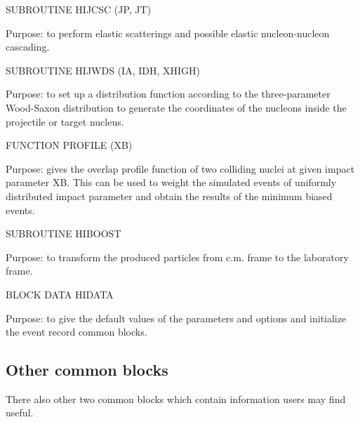 \begin{description}
\itemsep=-4.0pt
\item{}SUBROUTINE HIJCSC (JP, JT)
\item{}Purpose: to perform elastic scatterings and possible elastic
        nucleon-nucleon cascading.
\end{description}

\begin{description}
\itemsep=-4.0pt
\item{}SUBROUTINE HIJWDS (IA, IDH, XHIGH)
\item{}Purpose: to set up a distribution function according to the
        three-parameter Wood-Saxon distribution to generate the
        coordinates of the nucleons inside the projectile or
        target nucleus.
\end{description}

\begin{description}
\itemsep=-4.0pt
\item{}FUNCTION  PROFILE (XB)
\item{}Purpose: gives the overlap profile function of two colliding
        nuclei at given impact parameter XB. This can be used to
        weight the simulated events of uniformly distributed impact
        parameter and obtain the results of the minimum biased events.
\end{description}

\begin{description}
\itemsep=-4.0pt
\item{}SUBROUTINE HIBOOST
\item{}Purpose: to transform the produced particles from c.m. frame
        to the laboratory frame.
\end{description}

\begin{description}
\itemsep=-4.0pt
\item{}BLOCK DATA HIDATA
\item{}Purpose: to give the default values of the parameters and 
        options and initialize the event record common blocks.
\end{description}

\subsection{Other common blocks}

        There also other two common blocks which contain information
users may find useful.

